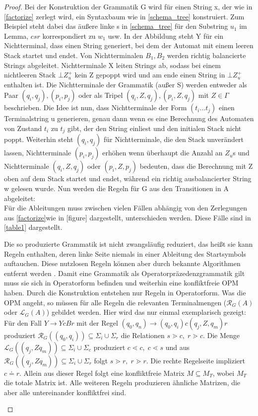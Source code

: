 \begin{proof}
Bei der Konstruktion der Grammatik G wird für einen String x, der wie in \autoref{factorize} zerlegt wird, ein Syntaxbaum wie in \autoref{schema_tree}  konstruiert. Zum Beispiel steht dabei das äußere linke s in \autoref{schema_tree} für den Substring $u_1$ im Lemma, $csr$ korrespondiert zu $w_1$ usw. 
In der Abbildung steht Y für ein Nichtterminal, dass einen String generiert, bei dem der Automat mit einem leeren Stack startet und endet.
Von Nichtterminalen $B_1, B_2$ werden richtig balancierte Strings abgeleitet. Nichtterminale X leiten Strings ab, sodass bei einem nichtleeren Stack $\bot Z_u^+$ kein Z gepoppt wird und am ende einen String in $\bot Z_u^+$ enthalten ist. Die Nichtterminale der Grammatik (außer S) werden entweder als Paar $(q_i, q_j) , (p_i, p_j)$ oder als Tripel $(q_i, Z, q_j), (p_i, Z, q_j)$ mit $Z \in \Gamma$ beschrieben. Die Idee ist nun, dass Nichtterminale der Form $(t_i...t_j)$ einen Terminalstring u generieren, genau dann wenn es eine Berechnung des Automaten  von Zustand $t_i$ zu $t_j$ gibt, der den String einliest und den initialen Stack nicht poppt. Weiterhin steht $(q_i, q_j)$ für Nichtterminale, die den Stack unverändert lassen, Nichtterminale $(p_i, p_j)$ erhöhen wenn überhaupt die Anzahl an $Z_u$s und Nichtterminale $(q_i, Z, q_j)$ oder $(p_i, Z, p_j)$ bedeuten, dass die Berechnung mit Z oben auf dem Stack startet und endet, während ein richtig ausbalancierter String w gelesen wurde. Nun werden die Regeln für G aus den Transitionen in A abgeleitet: \\
Für die Ableitungen muss zwischen vielen Fällen abhängig von den Zerlegungen aus \ref{factorize}wie in [figure] dargestellt, unterschieden werden. Diese Fälle sind in \autoref{table1} dargestellt.

Die so produzierte Grammatik ist nicht zwangsläufig reduziert, das heißt sie kann Regeln enthalten, deren linke Seite niemals in einer Ableitung des Startsymbols auftauchen. Diese nutzlosen Regeln können aber durch bekannte Algorithmen entfernt werden \cite{formallanguage}.
Damit eine Grammatik als Operatorpräzedenzgrammatik gilt muss sie sich in Operatorform befinden und weiterhin eine konfliktfreie OPM haben. Durch die Konstruktion entstehen nur Regeln in Operatorform. Was die OPM angeht, so müssen für alle Regeln die relevanten Terminalmengen ($\mathcal{R}_G(A)$ oder $\mathcal{L}_G(A)$) gebildet werden. Hier wird das nur einmal exemplarisch gezeigt: \\
Für den Fall $Y \rightarrow YcBr$ mit der Regel $(q_0, q_n) \rightarrow (q_0, q_i)c(q_j, Z, q_m)r$ produziert $\mathcal{R}_G ((q_0,q_i))\subseteq \Sigma_i \cup \Sigma_r$ die Relationen $s \gtrdot c, \; r \gtrdot c$. Die Menge $\mathcal{L}_G ((q_j,Z q_m))\subseteq \Sigma_i \cup \Sigma_c$ produziert $c\lessdot c, \; c \lessdot s$ und aus $\mathcal{R}_G ((q_j,Z q_m))\subseteq \Sigma_i \cup \Sigma_r$ folgt $ s \gtrdot r, \; r \gtrdot r$. Die rechte Regelseite impliziert $c \doteq r$. Allein aus dieser Regel folgt eine konfliktfreie Matrix $M \subseteq M_T$, wobei $M_T$ die totale Matrix ist. Alle weiteren Regeln produzieren ähnliche Matrizen, die aber alle untereinander konfliktfrei sind. 
\begin{table}
\begin{center}


\end{center}
\end{table}
\end{proof}
